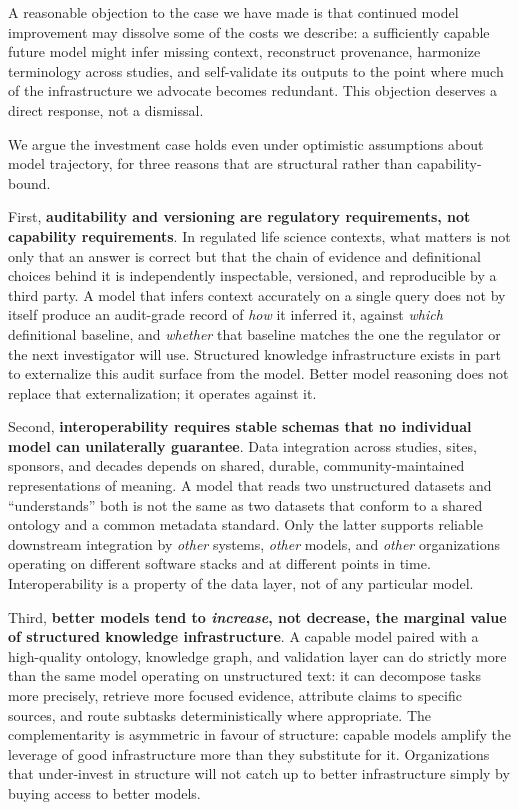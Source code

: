 \documentclass[man,12pt,donotrepeattitle]{apa7}
\begin{document}
A reasonable objection to the case we have made is that continued model
improvement may dissolve some of the costs we describe: a sufficiently
capable future model might infer missing context, reconstruct provenance,
harmonize terminology across studies, and self-validate its outputs to the
point where much of the infrastructure we advocate becomes redundant. This
objection deserves a direct response, not a dismissal.

We argue the investment case holds even under optimistic assumptions about
model trajectory, for three reasons that are structural rather than
capability-bound.

First, \textbf{auditability and versioning are regulatory requirements, not
capability requirements}. In regulated life science contexts, what matters
is not only that an answer is correct but that the chain of evidence and
definitional choices behind it is independently inspectable, versioned, and
reproducible by a third party. A model that infers context accurately on a
single query does not by itself produce an audit-grade record of \textit{how}
it inferred it, against \textit{which} definitional baseline, and
\textit{whether} that baseline matches the one the regulator or the next
investigator will use. Structured knowledge infrastructure exists in part to
externalize this audit surface from the model. Better model reasoning does
not replace that externalization; it operates against it.

Second, \textbf{interoperability requires stable schemas that no individual
model can unilaterally guarantee}. Data integration across studies, sites,
sponsors, and decades depends on shared, durable, community-maintained
representations of meaning. A model that reads two unstructured datasets and
``understands'' both is not the same as two datasets that conform to a
shared ontology and a common metadata standard. Only the latter supports
reliable downstream integration by \textit{other} systems, \textit{other}
models, and \textit{other} organizations operating on different software
stacks and at different points in time. Interoperability is a property of
the data layer, not of any particular model.

Third, \textbf{better models tend to \textit{increase}, not decrease, the
marginal value of structured knowledge infrastructure}. A capable model
paired with a high-quality ontology, knowledge graph, and validation layer
can do strictly more than the same model operating on unstructured text: it
can decompose tasks more precisely, retrieve more focused evidence, attribute
claims to specific sources, and route subtasks deterministically where
appropriate. The complementarity is asymmetric in favour of structure:
capable models amplify the leverage of good infrastructure more than they
substitute for it. Organizations that under-invest in structure will not
catch up to better infrastructure simply by buying access to better models.
\end{document}

